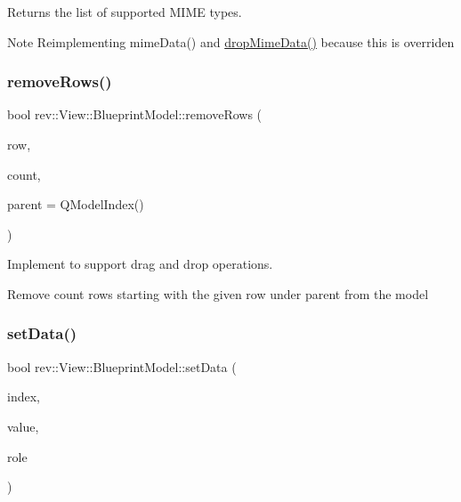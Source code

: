Returns the list of supported M\+I\+ME types. 

\begin{DoxyNote}{Note}
Reimplementing mime\+Data() and \mbox{\hyperlink{classrev_1_1_view_1_1_blueprint_model_ad000f8fdde3c606931a0121f6c5647d2}{drop\+Mime\+Data()}} because this is overriden 
\end{DoxyNote}
\mbox{\label{classrev_1_1_view_1_1_blueprint_model_ae6439b14843136ce564a2048cbc1d2fc}} 
\subsubsection{\texorpdfstring{removeRows()}{removeRows()}}
{\footnotesize\ttfamily bool rev\+::\+View\+::\+Blueprint\+Model\+::remove\+Rows (\begin{DoxyParamCaption}\item[{int}]{row,  }\item[{int}]{count,  }\item[{const Q\+Model\+Index \&}]{parent = {\ttfamily QModelIndex()} }\end{DoxyParamCaption})\hspace{0.3cm}{\ttfamily [override]}}



Implement to support drag and drop operations. 

Remove count rows starting with the given row under parent from the model \mbox{\label{classrev_1_1_view_1_1_blueprint_model_a3667248cf4682dd62fe544c010eda75a}} 
\subsubsection{\texorpdfstring{setData()}{setData()}}
{\footnotesize\ttfamily bool rev\+::\+View\+::\+Blueprint\+Model\+::set\+Data (\begin{DoxyParamCaption}\item[{const Q\+Model\+Index \&}]{index,  }\item[{const Q\+Variant \&}]{value,  }\item[{int}]{role }\end{DoxyParamCaption})\hspace{0.3cm}{\ttfamily [override]}}



